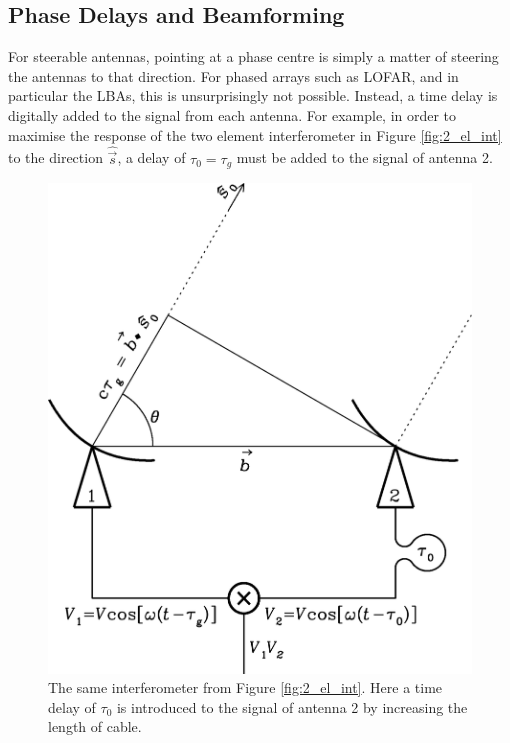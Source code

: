\subsection{Phase Delays and Beamforming}
\label{sec:beamform_theory}
For steerable antennas, pointing at a phase centre is simply a matter of steering the antennas to that direction. For phased arrays such as LOFAR, and in particular the LBAs, this is unsurprisingly not possible. Instead, a time delay is digitally added to the signal from each antenna. For example, in order to maximise the response of the two element interferometer in Figure \ref{fig:2_el_int} to the direction $\hat{\Vec{s}}$, a delay of $\tau_0 = \tau_g$ must be added to the signal of antenna 2. 

\begin{figure}[ht]
    \centering
    \includegraphics[width=0.75\columnwidth]{Images/2_elem_int_delay.png}
    \caption[A two element interferometer with a time delay added to one signal.]{The same interferometer from Figure \ref{fig:2_el_int}. Here a time delay of $\tau_0$ is introduced to the signal of antenna 2 by increasing the length of cable.}
    \label{fig:2_el_int_delay}
\end{figure}

